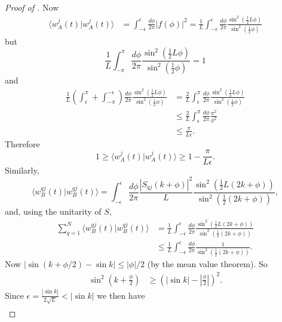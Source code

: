 \documentclass[../thesis-main/thesis-main]{subfiles}
\begin{document}
\begin{proof}[Proof of {}]
Now
\begin{align*}
\langle w_{A}^{j}(t)|w_{A}^{j}(t)\rangle & = \int_{-\epsilon}^{\epsilon}\frac{d\phi}{2\pi}\left|f(\phi)\right|^{2}
 = \frac{1}{L} \int_{-\epsilon}^{\epsilon}\frac{d\phi}{2\pi}\frac{\sin^{2}(\frac{1}{2}L\phi)}{\sin^{2}(\frac{1}{2}\phi)}
 \end{align*}
but
\begin{equation}
\frac{1}{L} \int_{-\pi}^{\pi}\frac{d\phi}{2\pi}\frac{\sin^{2}(\frac{1}{2}L\phi)}{\sin^{2}(\frac{1}{2}\phi)}=1
\end{equation}
and
\begin{align}
\frac{1}{L}\left(\int_{\epsilon}^{\pi}+\int_{-\pi}^{-\epsilon}\right)\frac{d\phi}{2\pi}\frac{\sin^{2}(\frac{1}{2}L\phi)}{\sin^{2}(\frac{1}{2}\phi)} & = \frac{2}{L} \int_{\epsilon}^{\pi}\frac{d\phi}{2\pi}\frac{\sin^{2}(\frac{1}{2}L\phi)}{\sin^{2}(\frac{1}{2}\phi)}\nonumber \\
 & \leq \frac{2}{L}\int_{\epsilon}^{\pi}\frac{d\phi}{2\pi}\frac{\pi^{2}}{\phi^{2}}\nonumber \\
 & \leq \frac{\pi}{L\epsilon}.\label{eq:fbound}
\end{align}
Therefore
\begin{equation}
1\geq\langle w_{A}^{j}(t)|w_{A}^{j}(t)\rangle\geq1-\frac{\pi}{L\epsilon}.
\end{equation}
Similarly,
\begin{equation}
\langle w_{B}^{qj}(t)|w_{B}^{qj}(t)\rangle=\int_{-\epsilon}^{\epsilon}\frac{d\phi}{2\pi}\frac{\left|S_{qj}(k+\phi)\right|^{2}}{L}\frac{\sin^{2}(\frac{1}{2}L(2k+\phi))}{\sin^{2}(\frac{1}{2}(2k+\phi))},\end{equation}
and, using the unitarity of $S$,
\begin{align*}
\sum_{q=1}^{N}\langle w_{B}^{qj}(t)|w_{B}^{qj}(t)\rangle & = \frac{1}{L}\int_{-\epsilon}^{\epsilon}\frac{d\phi}{2\pi}\frac{\sin^{2}(\frac{1}{2}L(2k+\phi))}{\sin^{2}(\frac{1}{2}(2k+\phi))}\\
 & \leq \frac{1}{L} \int_{-\epsilon}^{\epsilon}\frac{d\phi}{2\pi}\frac{1}{\sin^{2}(\frac{1}{2}(2k+\phi))}.
\end{align*}
Now $|{\sin(k+{\phi}/{2}) - \sin k}| \leq {|\phi|}/{2}$ (by the mean value theorem). So
\begin{align*}
\sin^{2}\left(k+\frac{\phi}{2}\right) & \geq \left(\left|\sin k\right|-\left|\frac{\phi}{2}\right|\right)^{2}.
\end{align*}
Since $\epsilon=\frac{\left|\sin k\right|}{2\sqrt{L}}<\left|\sin k\right|$
we then have \begin{align*}

\end{align*}
\end{proof}
\end{document}

